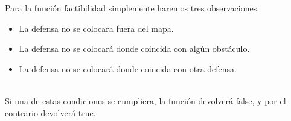 Para la función factibilidad simplemente haremos tres observaciones. \\
\begin{itemize}
    \item La defensa no se colocara fuera del mapa.
    \item La defensa no se colocará donde coincida con algún obstáculo.
    \item La defensa no se colocará donde coincida con otra defensa.
\end{itemize}\\
Si una de estas condiciones se cumpliera, la función devolverá false, y por el contrario devolverá true.